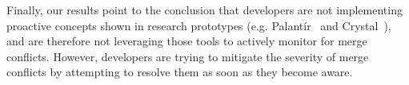 Finally, our results point to the conclusion that developers are not implementing proactive concepts shown in research prototypes (e.g. Palant\'{i}r~\cite{sarma_palantir:_2003} and Crystal~\cite{Brun2011}), and are therefore not leveraging those tools to actively monitor for merge conflicts.
However, developers are trying to mitigate the severity of merge conflicts by attempting to resolve them as soon as they become aware.
